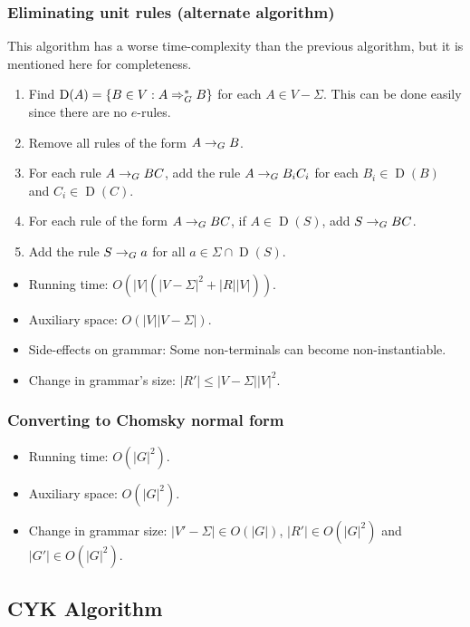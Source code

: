 \subsubsection{Eliminating unit rules (alternate algorithm)}

This algorithm has a worse time-complexity than the previous algorithm,
but it is mentioned here for completeness.

\begin{enumerate}
\item Find $\operatorname{D}(A) = \{B \in V: A \Rightarrow_{G}^* B\}$ for each $A \in V-\Sigma$.
    This can be done easily since there are no $e$-rules.
\item Remove all rules of the form $A \rightarrow_{G} B$.
\item For each rule $A \rightarrow_{G} BC$, add the rule
    $A \rightarrow_{G} B_iC_i$ for each $B_i \in \operatorname{D}(B)$ and $C_i \in \operatorname{D}(C)$.
\item For each rule of the form $A \rightarrow_{G} BC$, if $A \in \operatorname{D}(S)$,
    add $S \rightarrow_{G} BC$.
\item Add the rule $S \rightarrow_{G} a$ for all $a \in \Sigma \cap \operatorname{D}(S)$.
\end{enumerate}

\begin{itemize}
\item Running time: $O(|V|(|V-\Sigma|^2 + |R||V|))$.
\item Auxiliary space: $O(|V||V-\Sigma|)$.
\item Side-effects on grammar: Some non-terminals can become non-instantiable.
\item Change in grammar's size: $|R'| \le |V-\Sigma||V|^2$.
\end{itemize}

\subsubsection{Converting to Chomsky normal form}

\begin{itemize}
\item Running time: $O(|G|^2)$.
\item Auxiliary space: $O(|G|^2)$.
\item Change in grammar size: $|V'-\Sigma| \in O(|G|)$, $|R'| \in O(|G|^2)$ and $|G'| \in O(|G|^2)$.
\end{itemize}

\subsection{CYK Algorithm}

